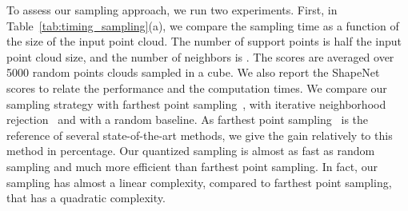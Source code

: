 To assess our sampling approach, we run two experiments.
First, in Table~\ref{tab:timing_sampling}(a), we compare the sampling time as a function of the size of the input point cloud.
The number of support points is half the input point cloud size, and the number of neighbors is . The scores are averaged over 5000 random points clouds sampled in a cube.
We also report the ShapeNet scores to relate the performance and the computation times.
We compare our sampling strategy with farthest point sampling~\cite{qi2017pointnet++}, with iterative neighborhood rejection~\cite{boulch2020convpoint} and with a random baseline.
As farthest point sampling~\cite{qi2017pointnet++} is the reference of several state-of-the-art methods, we give the gain relatively to this method in percentage.
Our quantized sampling is almost as fast as random sampling and much more efficient than farthest point sampling.
In fact, our sampling has almost a linear complexity, compared to farthest point sampling, that has a quadratic complexity.

